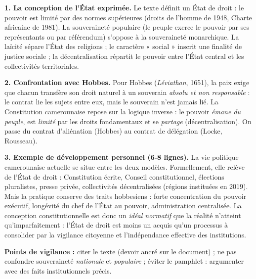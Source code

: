\documentclass[11pt]{article}
\newcommand{\cle}[1]{{\popxbold\color{popdark}#1}}
\begin{document}
\begin{corrige}

\textbf{1. La conception de l'État exprimée.} Le texte définit un \cle{État de droit} : le pouvoir est limité par des normes supérieures (droits de l'homme de 1948, Charte africaine de 1981). La \cle{souveraineté populaire} (le peuple exerce le pouvoir par ses représentants ou par référendum) s'oppose à la souveraineté monarchique. La \cle{laïcité} sépare l'État des religions ; le caractère « social » inscrit une finalité de justice sociale ; la \cle{décentralisation} répartit le pouvoir entre l'État central et les collectivités territoriales.

\textbf{2. Confrontation avec Hobbes.} Pour Hobbes (\emph{Léviathan}, 1651), la paix exige que chacun transfère son droit naturel à un souverain \emph{absolu et non responsable} : le contrat lie les sujets entre eux, mais le souverain n'est jamais lié. La Constitution camerounaise repose sur la logique inverse : le pouvoir \emph{émane du peuple}, est \emph{limité} par les droits fondamentaux et se \emph{partage} (décentralisation). On passe du contrat d'aliénation (Hobbes) au contrat de délégation (Locke, Rousseau).

\textbf{3. Exemple de développement personnel (6-8 lignes).} La vie politique camerounaise actuelle se situe entre les deux modèles. Formellement, elle relève de l'État de droit : Constitution écrite, Conseil constitutionnel, élections pluralistes, presse privée, collectivités décentralisées (régions instituées en 2019). Mais la pratique conserve des traits hobbesiens : forte concentration du pouvoir exécutif, longévité du chef de l'État au pouvoir, administration centralisée. La conception constitutionnelle est donc un \emph{idéal normatif} que la réalité n'atteint qu'imparfaitement : l'État de droit est moins un acquis qu'un processus à consolider par la vigilance citoyenne et l'indépendance effective des institutions.

\textbf{Points de vigilance :} citer le texte (devoir ancré sur le document) ; ne pas confondre souveraineté \emph{nationale} et \emph{populaire} ; éviter le pamphlet : argumenter avec des faits institutionnels précis.

\end{corrige}
\end{document}
